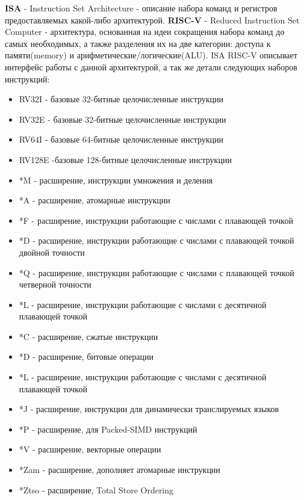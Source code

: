 \documentclass{article}
\begin{document}
\textbf{ISA} - Instruction Set Architecture - описание набора команд и регистров предоставляемых какой-либо архитектурой. \textbf{RISC-V} - Reduced Instruction Set Computer - архитектура, основанная на идеи сокращения набора команд до самых необходимых, а также разделения их на две категории: доступа к памяти(memory) и арифметические/логические(ALU). ISA RISC-V описывает интерфейс работы с данной архитектурой, а так же детали следующих наборов инструкций:
\begin{itemize}
	\item{RV32I - базовые 32-битные целочисленные инструкции}
	\item{RV32E - базовые 32-битные целочисленные инструкции}
	\item{RV64I - базовые 64-битные целочисленные инструкции}
	\item{RV128E -базовые 128-битные целочисленные инструкции}
	\item{*M - расширение, инструкции умножения и деления}
	\item{*A - расширение, атомарные инструкции}
	\item{*F - расширение, инструкции работающие с числами с плавающей точкой}
	\item{*D - расширение, инструкции работающие с числами с плавающей точкой двойной точности}
	\item{*Q - расширение, инструкции работающие с числами с плавающей точкой четверной точности}
	\item{*L - расширение, инструкции работающие с числами с десятичной плавающей точкой}
	\item{*C - расширение, сжатые инструкции}
	\item{*D - расширение, битовые операции}
	\item{*L - расширение, инструкции работающие с числами с десятичной плавающей точкой}
	\item{*J - расширение, инструкции для динамически транслируемых языков}
	\item{*P - расширение, для Packed-SIMD инструкций}
	\item{*V - расширение, векторные операции}
	\item{*Zam - расширение, дополняет атомарные инструкции}
	\item{*Ztso - расширение, Total Store Ordering}
\end{itemize}
\end{document}
